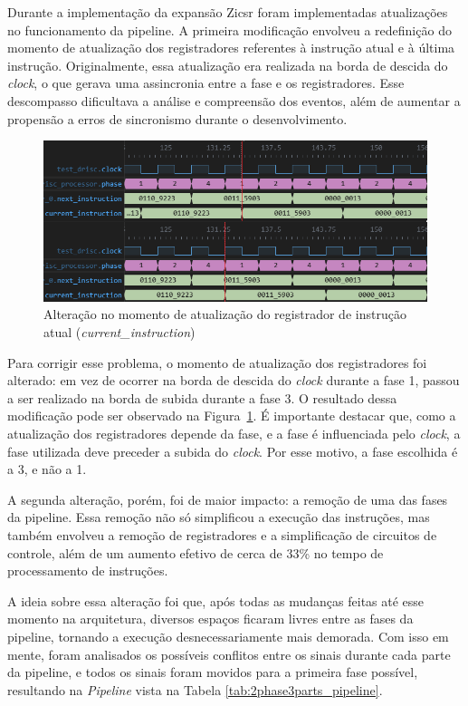 \documentclass[
	12pt,				%
	openright,			%
	oneside,			%
	a4paper,			%
	english,			%
	french,				%
	spanish,			%
	brazil,				%
	]{abntex2}
\begin{document}
Durante a implementação da expansão Zicsr foram implementadas atualizações no funcionamento da pipeline. A primeira modificação envolveu a redefinição do momento de atualização dos registradores referentes à instrução atual e à última instrução. Originalmente, essa atualização era realizada na borda de descida do \textit{clock}, o que gerava uma assincronia entre a fase e os registradores. Esse descompasso dificultava a análise e compreensão dos eventos, além de aumentar a propensão a erros de sincronismo durante o desenvolvimento.

\begin{figure}[h]
    \centering
    \includegraphics[width=0.75\linewidth]{ProcessoDesenvolvimento/Arquitetura/NovoTiming_1.png}
    \caption{Alteração no momento de atualização do registrador de instrução atual (\textit{current\_instruction})}
    \label{fig:current_inst_sync}
\end{figure}

Para corrigir esse problema, o momento de atualização dos registradores foi alterado: em vez de ocorrer na borda de descida do \textit{clock} durante a fase 1, passou a ser realizado na borda de subida durante a fase 3. O resultado dessa modificação pode ser observado na Figura~\ref{fig:current_inst_sync}. É importante destacar que, como a atualização dos registradores depende da fase, e a fase é influenciada pelo \textit{clock}, a fase utilizada deve preceder a subida do \textit{clock}. Por esse motivo, a fase escolhida é a 3, e não a 1.

A segunda alteração, porém,  foi de maior impacto: a remoção de uma das fases da pipeline. Essa remoção  não só simplificou a execução das instruções, mas também envolveu a remoção de registradores e a simplificação de circuitos de controle, além de um aumento efetivo de cerca de 33\% no tempo de processamento de instruções.

A ideia sobre essa alteração foi que, após todas as mudanças feitas até esse momento na arquitetura, diversos espaços ficaram livres entre as fases da pipeline, tornando a execução desnecessariamente mais demorada. Com isso em mente, foram analisados os possíveis conflitos entre os sinais durante cada parte da pipeline, e todos os sinais foram movidos para a primeira fase possível, resultando na \textit{Pipeline} vista na Tabela \ref{tab:2phase3parts_pipeline}. 
\end{document}
